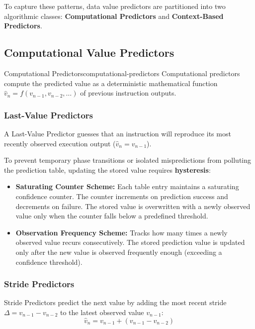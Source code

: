 To capture these patterns, data value predictors are partitioned into two algorithmic classes: \textbf{Computational Predictors} and \textbf{Context-Based Predictors}.

\subsection{Computational Value Predictors}
\label{subsec:computational_predictors}

\begin{concept}{Computational Predictors}{computational-predictors}
Computational predictors compute the predicted value as a deterministic mathematical function $\hat{v}_n = f(v_{n-1}, v_{n-2}, \dots)$ of previous instruction outputs.
\end{concept}

\subsubsection{Last-Value Predictors}
A Last-Value Predictor guesses that an instruction will reproduce its most recently observed execution output ($\hat{v}_n = v_{n-1}$).

To prevent temporary phase transitions or isolated mispredictions from polluting the prediction table, updating the stored value requires \textbf{hysteresis}:
\begin{itemize}
    \item \textbf{Saturating Counter Scheme:} Each table entry maintains a saturating confidence counter. The counter increments on prediction success and decrements on failure. The stored value is overwritten with a newly observed value only when the counter falls below a predefined threshold.
    \item \textbf{Observation Frequency Scheme:} Tracks how many times a newly observed value recurs consecutively. The stored prediction value is updated only after the new value is observed frequently enough (exceeding a confidence threshold).
\end{itemize}

\subsubsection{Stride Predictors}
Stride Predictors predict the next value by adding the most recent stride $\Delta = v_{n-1} - v_{n-2}$ to the latest observed value $v_{n-1}$:
\begin{equation}
\hat{v}_n = v_{n-1} + (v_{n-1} - v_{n-2})
\end{equation}

